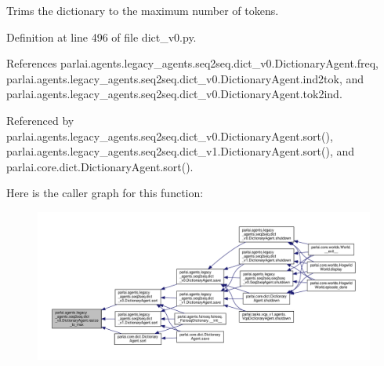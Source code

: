 \begin{DoxyVerb}Trims the dictionary to the maximum number of tokens.\end{DoxyVerb}
 

Definition at line 496 of file dict\+\_\+v0.\+py.



References parlai.\+agents.\+legacy\+\_\+agents.\+seq2seq.\+dict\+\_\+v0.\+Dictionary\+Agent.\+freq, parlai.\+agents.\+legacy\+\_\+agents.\+seq2seq.\+dict\+\_\+v0.\+Dictionary\+Agent.\+ind2tok, and parlai.\+agents.\+legacy\+\_\+agents.\+seq2seq.\+dict\+\_\+v0.\+Dictionary\+Agent.\+tok2ind.



Referenced by parlai.\+agents.\+legacy\+\_\+agents.\+seq2seq.\+dict\+\_\+v0.\+Dictionary\+Agent.\+sort(), parlai.\+agents.\+legacy\+\_\+agents.\+seq2seq.\+dict\+\_\+v1.\+Dictionary\+Agent.\+sort(), and parlai.\+core.\+dict.\+Dictionary\+Agent.\+sort().

Here is the caller graph for this function\+:
\nopagebreak
\begin{figure}[H]
\begin{center}
\leavevmode
\includegraphics[width=350pt]{classparlai_1_1agents_1_1legacy__agents_1_1seq2seq_1_1dict__v0_1_1DictionaryAgent_ab5351c542cbfdeeb9a2bc24227253fb3_icgraph}
\end{center}
\end{figure}
\mbox{\label{classparlai_1_1agents_1_1legacy__agents_1_1seq2seq_1_1dict__v0_1_1DictionaryAgent_ab2838da6f97c13b8eae241ac6db59417}} 
